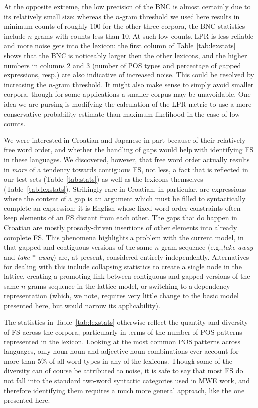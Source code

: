 \documentclass[11pt,letterpaper]{article}
\makeatletter
\def \eg {e.g.,\@ }
\newcommand{\gap}{$*$\xspace}
\newcommand{\ex}[1]{\textit{#1}\xspace}
\newcommand{\tabref}[2][]{Table#1~\ref{#2}\xspace}
\makeatother
\begin{document}
At the opposite extreme, the low precision of the BNC is almost certainly due to its relatively small size: whereas the $n$-gram threshold we used here results in minimum counts of roughly 100 for the other three corpora, the BNC statistics include $n$-grams with counts less than 10. At such low counts, LPR is less reliable and more noise gets into the lexicon: the first column of \tabref{tab:lexstats} shows that the BNC is noticeably larger then the other lexicons, and the higher numbers in columns 2 and 3 (number of POS types and percentage of gapped expressions, resp.) are also indicative of increased noise.  This  could be resolved by increasing the $n$-gram threshold. It might also make sense to simply avoid smaller corpora, though for some applications a smaller corpus may be unavoidable. One idea we are pursing is modifying the calculation of the LPR metric to use a more conservative  probability estimate than maximum likelihood in the case of low counts.

We were interested in Croatian and Japanese in part because of their relatively free word order, and whether the handling of gaps would help with identifying FS in these languages. We discovered, however, that free word order actually results in \emph{more} of a tendency towards contiguous FS, not less, a fact that is reflected in our test sets (\tabref{tab:stats}) as well as the lexicons themselves (\tabref{tab:lexstats}). Strikingly rare in Croatian, in particular, are expressions where the content of a gap is an argument which must be filled to syntactically complete an expression: it is English whose fixed-word-order constraints often keep elements of an FS distant from each other. The gaps that do happen in Croatian are mostly prosody-driven insertions of other elements into already complete FS. This phenomena highlights a problem with the current model, in that gapped and contiguous versions of the same $n$-gram sequence (\eg \ex{take away} and \ex{take \gap away}) are, at present, considered entirely independently. Alternatives for dealing with this include collapsing statistics to create a single node in the lattice, creating a promoting link between contiguous and gapped versions of the same $n$-grams sequence in the lattice model, or switching to a dependency representation (which, we note, requires very little change to the basic model presented here, but would narrow its applicability). 


The statistics in \tabref{tab:lexstats} otherwise reflect the quantity and diversity of FS across the corpora, particularly in terms of the number of POS patterns represented in the lexicon. Looking at the most common POS patterns across languages, only noun-noun and adjective-noun combinations ever account for more than 5\% of all word types in any of the lexicons. Though some of the diversity can of course be attributed to noise, it is safe to say that most FS do not fall into the standard two-word syntactic categories used in MWE work, and therefore identifying them requires a much more general approach, like the one presented here.
\end{document}
